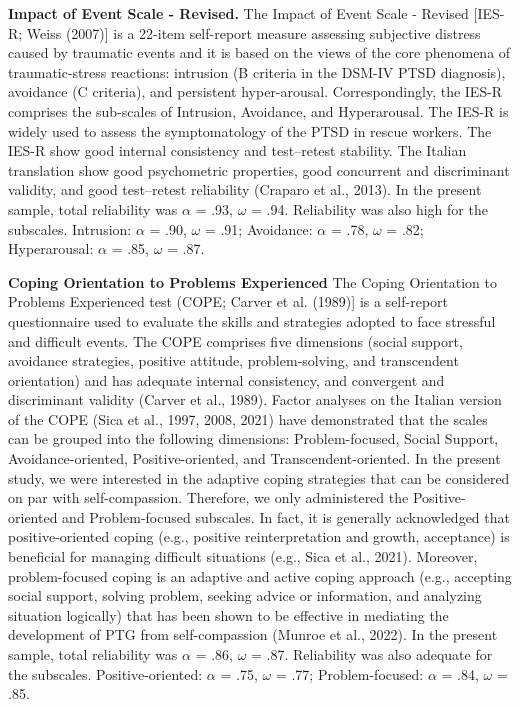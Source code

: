 \documentclass[
]{apa7}
\begin{document}
\textbf{Impact of Event Scale - Revised.} The Impact of Event Scale -
Revised {[}IES-R; Weiss (2007){]} is a 22-item self-report measure
assessing subjective distress caused by traumatic events and it is based
on the views of the core phenomena of traumatic-stress reactions:
intrusion (B criteria in the DSM-IV PTSD diagnosis), avoidance (C
criteria), and persistent hyper-arousal. Correspondingly, the IES-R
comprises the sub-scales of Intrusion, Avoidance, and Hyperarousal. The
IES-R is widely used to assess the symptomatology of the PTSD in rescue
workers. The IES-R show good internal consistency and test--retest
stability. The Italian translation show good psychometric properties,
good concurrent and discriminant validity, and good test--retest
reliability (Craparo et al., 2013). In the present sample, total
reliability was \(\alpha\) = .93, \(\omega\) = .94. Reliability was also
high for the subscales. Intrusion: \(\alpha\) = .90, \(\omega\) = .91;
Avoidance: \(\alpha\) = .78, \(\omega\) = .82; Hyperarousal: \(\alpha\)
= .85, \(\omega\) = .87.

\textbf{Coping Orientation to Problems Experienced} The Coping
Orientation to Problems Experienced test (COPE; Carver et al. (1989){]}
is a self-report questionnaire used to evaluate the skills and
strategies adopted to face stressful and difficult events. The COPE
comprises five dimensions (social support, avoidance strategies,
positive attitude, problem-solving, and transcendent orientation) and
has adequate internal consistency, and convergent and discriminant
validity (Carver et al., 1989). Factor analyses on the Italian version
of the COPE (Sica et al., 1997, 2008, 2021) have demonstrated that the
scales can be grouped into the following dimensions: Problem-focused,
Social Support, Avoidance-oriented, Positive-oriented, and
Transcendent-oriented. In the present study, we were interested in the
adaptive coping strategies that can be considered on par with
self-compassion. Therefore, we only administered the Positive-oriented
and Problem-focused subscales. In fact, it is generally acknowledged
that positive-oriented coping (e.g., positive reinterpretation and
growth, acceptance) is beneficial for managing difficult situations
(e.g., Sica et al., 2021). Moreover, problem-focused coping is an
adaptive and active coping approach (e.g., accepting social support,
solving problem, seeking advice or information, and analyzing situation
logically) that has been shown to be effective in mediating the
development of PTG from self-compassion (Munroe et al., 2022). In the
present sample, total reliability was \(\alpha\) = .86, \(\omega\) =
.87. Reliability was also adequate for the subscales. Positive-oriented:
\(\alpha\) = .75, \(\omega\) = .77; Problem-focused: \(\alpha\) = .84,
\(\omega\) = .85.
\end{document}
